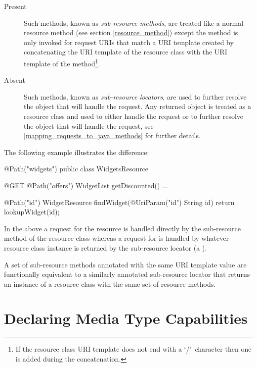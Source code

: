 \begin{description}
\item[Present] Such methods, known as {\em sub-resource methods}, are treated like a normal resource method (see section \ref{resource_method}) except the method is only invoked for request URIs that match a URI template created by concatenating the URI template of the resource class with the URI template of the method\footnote{If the resource class URI template does not end with a \lq/\rq\ character then one is added during the concatenation.}.
\item[Absent] Such methods, known as {\em sub-resource locators}, are used to further resolve the object that will handle the request. Any returned object is treated as a resource class and used to either handle the request or to further resolve the object that will handle the request, see \ref{mapping_requests_to_java_methods} for further details.
\end{description}

The following example illustrates the difference:

\begin{listing}{1}
@Path("widgets")
public class WidgetsResource {
  @GET
  @Path("offers")
  WidgetList getDiscounted() {...}
  
  @Path("{id}")
  WidgetResource findWidget(@UriParam("id") String id) {
    return lookupWidget(id);
  }
}\end{listing}

In the above a  request for the  resource is handled directly by the  sub-resource method of the resource class  whereas a  request for  is handled by whatever resource class instance is returned by the  sub-resource locator (a ).

\begin{nnnote}A set of sub-resource methods annotated with the same URI template value are functionally equivalent to a similarly annotated sub-resource locator that returns an instance of a resource class with the same set of resource methods.\end{nnnote}

\section{Declaring Media Type Capabilities}
\label{declaring_method_capabilities}

